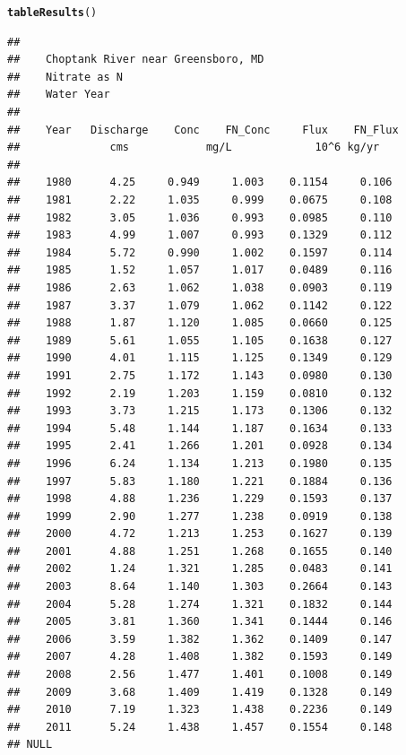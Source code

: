 \documentclass[a4paper,11pt]{article}\usepackage{graphicx, color}
\makeatletter
\newcommand{\hlfunctioncall}[1]{\textcolor[rgb]{0.501960784313725,0,0.329411764705882}{\textbf{#1}}}%
\newenvironment{kframe}{%
 \def\at@end@of@kframe{}%
 \ifinner\ifhmode%
  \def\at@end@of@kframe{\end{minipage}}%
  \begin{minipage}{\columnwidth}%
 \fi\fi%
 \def\FrameCommand##1{\hskip\@totalleftmargin \hskip-\fboxsep
 \colorbox{shadecolor}{##1}\hskip-\fboxsep
     \hskip-\linewidth \hskip-\@totalleftmargin \hskip\columnwidth}%
 \MakeFramed {\advance\hsize-\width
   \@totalleftmargin\z@ \linewidth\hsize
   \@setminipage}}%
 {\par\unskip\endMakeFramed%
 \at@end@of@kframe}
\newenvironment{knitrout}{}{} %
\makeatother
\begin{document}
\begin{knitrout}
\color{fgcolor}\begin{kframe}
\begin{alltt}
\hlfunctioncall{tableResults}()
\end{alltt}
\begin{verbatim}
## 
##    Choptank River near Greensboro, MD 
##    Nitrate as N
##    Water Year 
## 
##    Year   Discharge    Conc    FN_Conc     Flux    FN_Flux
##              cms            mg/L             10^6 kg/yr 
## 
##    1980      4.25     0.949     1.003    0.1154     0.106
##    1981      2.22     1.035     0.999    0.0675     0.108
##    1982      3.05     1.036     0.993    0.0985     0.110
##    1983      4.99     1.007     0.993    0.1329     0.112
##    1984      5.72     0.990     1.002    0.1597     0.114
##    1985      1.52     1.057     1.017    0.0489     0.116
##    1986      2.63     1.062     1.038    0.0903     0.119
##    1987      3.37     1.079     1.062    0.1142     0.122
##    1988      1.87     1.120     1.085    0.0660     0.125
##    1989      5.61     1.055     1.105    0.1638     0.127
##    1990      4.01     1.115     1.125    0.1349     0.129
##    1991      2.75     1.172     1.143    0.0980     0.130
##    1992      2.19     1.203     1.159    0.0810     0.132
##    1993      3.73     1.215     1.173    0.1306     0.132
##    1994      5.48     1.144     1.187    0.1634     0.133
##    1995      2.41     1.266     1.201    0.0928     0.134
##    1996      6.24     1.134     1.213    0.1980     0.135
##    1997      5.83     1.180     1.221    0.1884     0.136
##    1998      4.88     1.236     1.229    0.1593     0.137
##    1999      2.90     1.277     1.238    0.0919     0.138
##    2000      4.72     1.213     1.253    0.1627     0.139
##    2001      4.88     1.251     1.268    0.1655     0.140
##    2002      1.24     1.321     1.285    0.0483     0.141
##    2003      8.64     1.140     1.303    0.2664     0.143
##    2004      5.28     1.274     1.321    0.1832     0.144
##    2005      3.81     1.360     1.341    0.1444     0.146
##    2006      3.59     1.382     1.362    0.1409     0.147
##    2007      4.28     1.408     1.382    0.1593     0.149
##    2008      2.56     1.477     1.401    0.1008     0.149
##    2009      3.68     1.409     1.419    0.1328     0.149
##    2010      7.19     1.323     1.438    0.2236     0.149
##    2011      5.24     1.438     1.457    0.1554     0.148
## NULL
\end{verbatim}
\end{kframe}
\end{knitrout}
\end{document}
